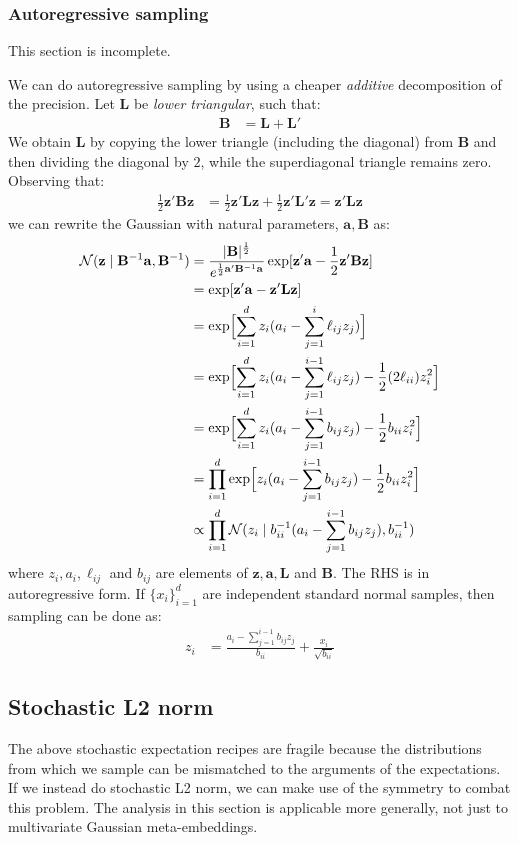 \documentclass[a4paper,oneside,12pt,english]{report}
\def\zvec{\mathbf{z}}
\def\ND{\mathcal{N}}
\def\detm#1{\lvert#1\rvert}
\def\Lmat{\mathbf{L}}
\def\Bmat{\mathbf{B}}
\def\avec{\mathbf{a}}
\begin{document}
\subsubsection{Autoregressive sampling}
This section is incomplete.

We can do autoregressive sampling by using a cheaper \emph{additive} decomposition of the precision. Let $\Lmat$ be \emph{lower triangular}, such that:
\begin{align}
\Bmat &= \Lmat + \Lmat'
\end{align} 
We obtain $\Lmat$ by copying the lower triangle (including the diagonal) from $\Bmat$ and then dividing the diagonal by $2$, while the superdiagonal triangle remains zero. Observing that:
\begin{align}
\frac12\zvec'\Bmat\zvec &=  \frac12 \zvec'\Lmat\zvec + \frac12 \zvec'\Lmat'\zvec = \zvec'\Lmat\zvec
\end{align} 
we can rewrite the Gaussian with natural parameters, $\avec,\Bmat$ as:
\begin{align}
\begin{split}
\ND(\zvec\mid\Bmat^{-1}\avec,\Bmat^{-1})&=\frac{\detm{\Bmat}^{\frac12}}{e^{\frac12\avec'\Bmat^{-1}\avec}} \exp[\zvec'\avec - \frac12\zvec'\Bmat\zvec] \\
&= \exp[\zvec'\avec - \zvec'\Lmat\zvec] \\
&= \exp\Bigl[\sum_{i=1}^dz_i (a_i - \sum_{j=1}^i\ell_{ij}z_j)\Bigr] \\
&= \exp\Bigl[\sum_{i=1}^dz_i (a_i - \sum_{j=1}^{i-1}\ell_{ij}z_j) - \frac12 (2\ell_{ii})z_i^2  \Bigr] \\
&= \exp\Bigl[\sum_{i=1}^dz_i (a_i - \sum_{j=1}^{i-1}b_{ij}z_j) - \frac12 b_{ii}z_i^2  \Bigr] \\
&= \prod_{i=1}^d \exp\Bigl[z_i (a_i - \sum_{j=1}^{i-1}b_{ij}z_j) - \frac12 b_{ii}z_i^2  \Bigr] \\
&\propto \prod_{i=1}^d \ND(z_i\mid b_{ii}^{-1}(a_i - \sum_{j=1}^{i-1}b_{ij}z_j), b_{ii}^{-1})
\end{split}
\end{align} 
where $z_i,a_i,\ell_{ij}$ and $b_{ij}$ are elements of $\zvec,\avec,\Lmat$ and $\Bmat$. The RHS is in autoregressive form. If $\{x_i\}_{i=1}^d$ are independent standard normal samples, then sampling can be done as:
\begin{align}
z_i &= \frac{a_i - \sum_{j=1}^{i-1}b_{ij}z_j}{b_{ii}} + \frac{x_i}{\sqrt{b_{ii}}} 
\end{align}


\subsection{Stochastic L2 norm}
\label{sec:stochL2}
\def\Mset{\mathcal{M}}
The above stochastic expectation recipes are fragile because the distributions from which we sample can be mismatched to the arguments of the expectations. If we instead do stochastic L2 norm, we can make use of the symmetry to combat this problem. The analysis in this section is applicable more generally, not just to multivariate Gaussian meta-embeddings.
\end{document}
